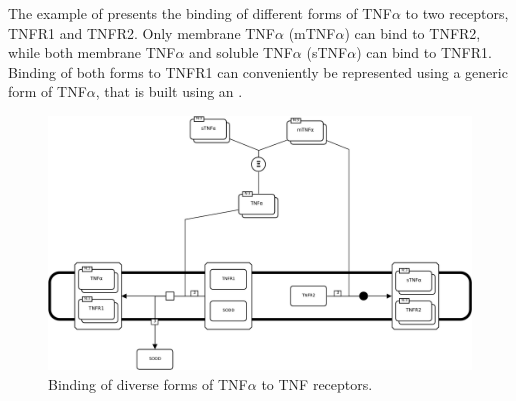 The example of  presents the binding of different forms of TNF$\alpha$ to two receptors, TNFR1 and TNFR2.
Only membrane TNF$\alpha$ (mTNF$\alpha$) can bind to TNFR2, while both membrane TNF$\alpha$ and soluble TNF$\alpha$ (sTNF$\alpha$) can bind to TNFR1.
Binding of both forms to TNFR1 can conveniently be represented using a generic form of TNF$\alpha$, that is built using an .


\begin{figure}
\begin{center}
\includegraphics[scale=0.45]{images/build/d1_1_example.pdf}
\end{center}
\caption{Binding of diverse forms of TNF$\alpha$ to TNF receptors.}
\label{fig:D1_1}
\end{figure}
